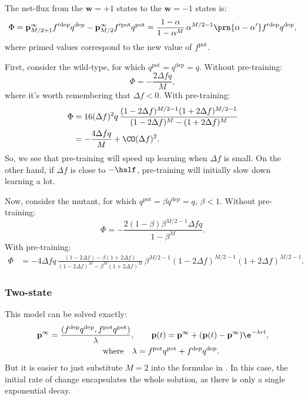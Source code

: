 \documentclass[12pt]{article}
\newcommand{\pr}{\mathbf{p}}
\newcommand{\eq}{\pr^\infty}
\newcommand{\w}{\mathbf{w}}
\newcommand{\pot}{^{\text{pot}}}
\newcommand{\dep}{^{\text{dep}}}
\begin{document}
The net-flux from the $\w=+1$ states to the $\w=-1$ states is:
%
\begin{equation}\label{eq:multiflux}
  \Phi = \eq_{M/2+1}f'{}\dep q\dep - \eq_{M/2}f'{}\pot q\pot = \frac{1-\alpha}{1-\alpha^M}\,\alpha^{M/2-1}\prn{\alpha-\alpha'}f'{}\dep q\dep,
\end{equation}
%
where primed values correspond to the new value of $f\pot$.

First, consider the wild-type, for which $q\pot=q\dep=q$.
Without pre-training:
%
\begin{equation}\label{eq:multiWTnopre}
  \Phi = -\frac{2\Delta fq}{M},
\end{equation}
%
where it's worth remembering that $\Delta f<0$.
With pre-training:
%
\begin{equation}\label{eq:multiWTpre}
\begin{aligned}
  \Phi &= 16(\Delta f)^2q \, \frac{(1-2\Delta f)^{M/2-1} (1+2\Delta f)^{M/2-1}}
          {(1-2\Delta f)^M - (1+2\Delta f)^M} \\
       &= -\frac{4\Delta fq}{M} + \CO(\Delta f)^2.
\end{aligned}
\end{equation}
%
So, we see that pre-training will speed up learning when $\Delta f$ is small.
On the other hand, if $\Delta f$ is close to $-\half$, pre-training will initially slow down learning a lot.

Now, consider the mutant, for which $q\pot=\beta q\dep=q$, $\beta<1$.
Without pre-training:
%
\begin{equation}\label{eq:multiKNnopre}
  \Phi = -\frac{2(1-\beta)\beta^{M/2-1}\Delta fq}{1-\beta^M}.
\end{equation}
%
With pre-training:
%
\begin{equation}\label{eq:multiKnpre}
\begin{aligned}
  \Phi &= -4\Delta f q \, \frac{(1-2\Delta f) - \beta(1+2\Delta f)}
          {(1-2\Delta f)^M - \beta^M(1+2\Delta f)^M}   \,
          \beta^{M/2-1}(1-2\Delta f)^{M/2-1} (1+2\Delta f)^{M/2-1}.
\end{aligned}
\end{equation}
%


\subsubsection{Two-state}\label{sec:binary}

This model can be solved exactly:
%
\begin{multline}\label{eq:binarysol}
  \eq = \frac{(f\dep q\dep, f\pot q\pot)}{\lambda},
  \qquad
  \pr(t) = \eq + (\pr(t)-\eq)\e^{-\lambda rt},\\
  \qquad \text{where} \quad
  \lambda = f\pot q\pot + f\dep q\dep.
\end{multline}
%
But it is easier to just substitute $M=2$ into the formulae in .
In this case, the initial rate of change encapsulates the whole solution, as there is only a single exponential decay.
\end{document}
